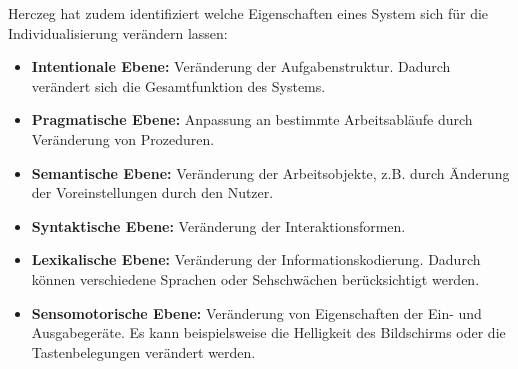 
Herczeg \cite{Herczeg2006} hat zudem identifiziert welche Eigenschaften eines System sich für die Individualisierung verändern lassen:
\begin{itemize}
\item \textbf{Intentionale Ebene:} Veränderung der Aufgabenstruktur. Dadurch verändert sich die Gesamtfunktion des Systems.
\item \textbf{Pragmatische Ebene:} Anpassung an bestimmte Arbeitsabläufe durch Veränderung von Prozeduren.
\item \textbf{Semantische Ebene:} Veränderung der Arbeitsobjekte, z.B. durch Änderung der Voreinstellungen durch den Nutzer.
\item \textbf{Syntaktische Ebene:} Veränderung der Interaktionsformen.
\item \textbf{Lexikalische Ebene:} Veränderung der Informationskodierung. Dadurch können verschiedene Sprachen oder Sehschwächen berücksichtigt werden.
\item \textbf{Sensomotorische Ebene:} Veränderung von Eigenschaften der Ein- und Ausgabegeräte. Es kann beispielsweise die Helligkeit des Bildschirms oder die Tastenbelegungen verändert werden.
\end{itemize}

